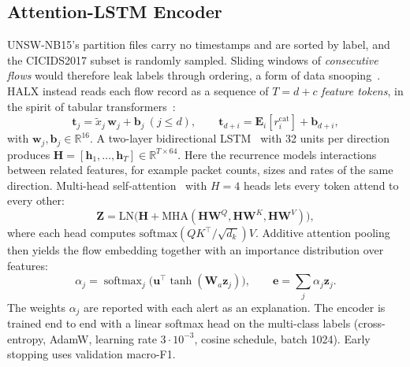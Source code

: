 \subsection{Attention-LSTM Encoder}
\label{sec:encoder}
UNSW-NB15's partition files carry no timestamps and are sorted by label, and
the CICIDS2017 subset is randomly sampled. Sliding windows of
\emph{consecutive flows} would therefore leak labels through ordering, a form of
data snooping~\cite{arp2022dos}. HALX instead reads each flow record as a
sequence of $T=d+c$ \emph{feature tokens}, in the spirit of tabular
transformers~\cite{gorishniy2021revisiting}:
\begin{equation}
  \mathbf{t}_j=\tilde{x}_j\,\mathbf{w}_j+\mathbf{b}_j\ (j\le d),\qquad
  \mathbf{t}_{d+i}=\mathbf{E}_i[r^{\mathrm{cat}}_i]+\mathbf{b}_{d+i},
  \label{eq:tok}
\end{equation}
with $\mathbf{w}_j,\mathbf{b}_j\in\mathbb{R}^{16}$. A two-layer bidirectional
LSTM~\cite{hochreiter1997lstm} with 32 units per direction produces
$\mathbf{H}=[\mathbf{h}_1,\dots,\mathbf{h}_T]\in\mathbb{R}^{T\times64}$. Here
the recurrence models interactions between related features, for example
packet counts, sizes and rates of the same direction. Multi-head
self-attention~\cite{vaswani2017attention} with $H=4$ heads lets every token
attend to every other:
\begin{equation}
  \mathbf{Z}=\mathrm{LN}\bigl(\mathbf{H}+\mathrm{MHA}(\mathbf{H}\mathbf{W}^Q,
  \mathbf{H}\mathbf{W}^K,\mathbf{H}\mathbf{W}^V)\bigr),
  \label{eq:mha}
\end{equation}
where each head computes
$\mathrm{softmax}(QK^{\top}/\sqrt{d_k})V$. Additive attention pooling
then yields the flow embedding together with an importance distribution
over features:
\begin{equation}
  \alpha_j=\operatorname{softmax}_j\bigl(\mathbf{u}^{\top}\tanh(\mathbf{W}_a\mathbf{z}_j)\bigr),\qquad
  \mathbf{e}=\textstyle\sum_{j}\alpha_j\mathbf{z}_j .
  \label{eq:pool}
\end{equation}
The weights $\alpha_j$ are reported with each alert as an explanation.
The encoder is trained end to end with a linear softmax head on the
multi-class labels (cross-entropy, AdamW, learning rate $3\cdot10^{-3}$,
cosine schedule, batch 1024). Early stopping uses validation macro-F1.

